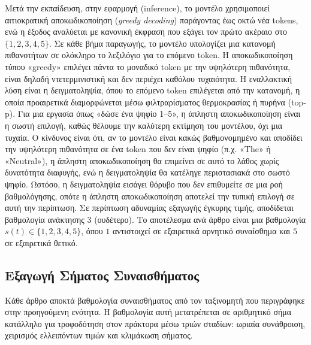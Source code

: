 Μετά την εκπαίδευση, στην εφαρμογή (inference), το μοντέλο
χρησιμοποιεί αιτιοκρατική αποκωδικοποίηση (\textit{greedy decoding}) παράγοντας
έως οκτώ νέα tokens, ενώ η έξοδος αναλύεται με κανονική έκφραση που εξάγει τον
πρώτο ακέραιο στο $\{1, 2, 3, 4, 5\}$. 
Σε κάθε βήμα παραγωγής, το μοντέλο υπολογίζει μια κατανομή πιθανοτήτων σε 
ολόκληρο το λεξιλόγιο για το επόμενο token. Η αποκωδικοποίηση τύπου 
«greedy» επιλέγει πάντα το μοναδικό token με την υψηλότερη πιθανότητα, είναι 
δηλαδή ντετερμινιστική και δεν περιέχει καθόλου τυχαιότητα. 
Η εναλλακτική λύση είναι η δειγματοληψία, όπου το επόμενο token επιλέγεται 
από την κατανομή, η οποία προαιρετικά διαμορφώνεται μέσω φιλτραρίσματος 
θερμοκρασίας ή πυρήνα (top-p).
Για μια εργασία όπως «δώσε ένα ψηφίο 1–5», η άπληστη αποκωδικοποίηση είναι 
η σωστή επιλογή, καθώς θέλουμε την καλύτερη εκτίμηση του μοντέλου, 
όχι μια τυχαία. Ο κίνδυνος είναι ότι, αν το μοντέλο είναι κακώς βαθμονομημένο 
και αποδίδει την υψηλότερη πιθανότητα σε ένα token που δεν είναι ψηφίο 
(π.χ. «The» ή «Neutral»), η άπληστη αποκωδικοποίηση θα επιμείνει σε αυτό 
το λάθος χωρίς δυνατότητα διαφυγής, ενώ η δειγματοληψία θα κατέληγε 
περιστασιακά στο σωστό ψηφίο. Ωστόσο, η δειγματοληψία εισάγει θόρυβο που 
δεν επιθυμείτε σε μια ροή βαθμολόγησης, οπότε η άπληστη αποκωδικοποίηση 
αποτελεί την τυπική επιλογή σε αυτή την περίπτωση.
Σε περίπτωση αδυναμίας εξαγωγής έγκυρης
τιμής, αποδίδεται βαθμολογία ανάκτησης $3$ (ουδέτερο). Το αποτέλεσμα ανά άρθρο
είναι μια βαθμολογία $s(t) \in \{1, 2, 3, 4, 5\}$, όπου $1$ αντιστοιχεί σε
εξαιρετικά αρνητικό συναίσθημα και $5$ σε εξαιρετικά θετικό.

\subsection{Εξαγωγή Σήματος Συναισθήματος}
\label{sec:sentiment}

Κάθε άρθρο αποκτά βαθμολογία συναισθήματος από τον ταξινομητή που περιγράφηκε
στην προηγούμενη ενότητα. Η βαθμολογία αυτή μετατρέπεται σε αριθμητικό σήμα
κατάλληλο για τροφοδότηση στον πράκτορα μέσω τριών σταδίων: ωριαία συνάθροιση,
χειρισμός ελλειπόντων τιμών και κλιμάκωση σήματος.

